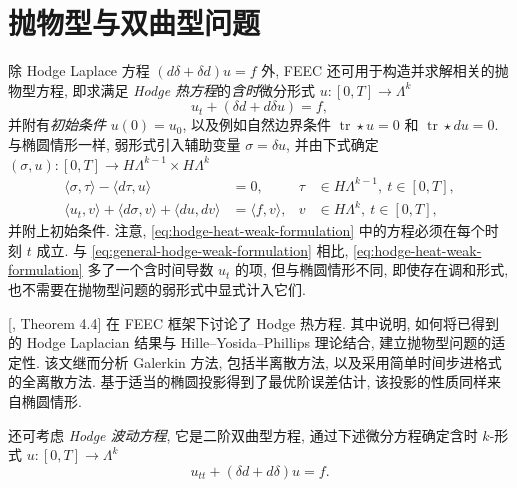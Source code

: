 \section{抛物型与双曲型问题}\label{sec:parabolic-hyperbolic}

除 Hodge Laplace 方程 $(d\delta+\delta d)u=f$ 外, FEEC 还可用于构造并求解相关的抛物型方程, 即求满足 \emph{Hodge 热方程}的\emph{含时}微分形式 $u:[0,T]\to\Lambda^k$
\begin{equation}\label{eq:hodge-heat-equation}
u_t+(\delta d+d\delta u)=f,
\end{equation}
并附有\emph{初始条件} $u(0)=u_0$, 以及例如自然边界条件 $\operatorname{tr}\star u=0$ 和 $\operatorname{tr}\star du=0$. 与椭圆情形一样, 弱形式引入辅助变量 $\sigma=\delta u$, 并由下式确定 $(\sigma,u):[0,T]\to H\Lambda^{k-1}\times H\Lambda^k$
\begin{equation}\label{eq:hodge-heat-weak-formulation}
\begin{aligned}
\langle\sigma,\tau\rangle-\langle d\tau,u\rangle&=0,&\tau&\in H\Lambda^{k-1},\ t\in[0,T],\\
\langle u_t,v\rangle+\langle d\sigma,v\rangle+\langle du,dv\rangle&=\langle f,v\rangle,&v&\in H\Lambda^k,\ t\in[0,T],
\end{aligned}
\end{equation}
并附上初始条件. 注意, \eqref{eq:hodge-heat-weak-formulation} 中的方程必须在每个时刻 $t$ 成立. 与 \eqref{eq:general-hodge-weak-formulation} 相比, \eqref{eq:hodge-heat-weak-formulation} 多了一个含时间导数 $u_t$ 的项, 但与椭圆情形不同, 即使存在调和形式, 也不需要在抛物型问题的弱形式中显式计入它们.

[, Theorem 4.4] 在 FEEC 框架下讨论了 Hodge 热方程. 其中说明, 如何将已得到的 Hodge Laplacian 结果与 Hille–Yosida–Phillips 理论结合, 建立抛物型问题的适定性. 该文继而分析 Galerkin 方法, 包括半离散方法, 以及采用简单时间步进格式的全离散方法. 基于适当的椭圆投影得到了最优阶误差估计, 该投影的性质同样来自椭圆情形.

还可考虑 \emph{Hodge 波动方程}, 它是二阶双曲型方程, 通过下述微分方程确定含时 $k$-形式 $u:[0,T]\to\Lambda^k$
\begin{equation}\label{eq:hodge-wave-equation}
u_{tt}+(\delta d+d\delta)u=f.
\end{equation}

